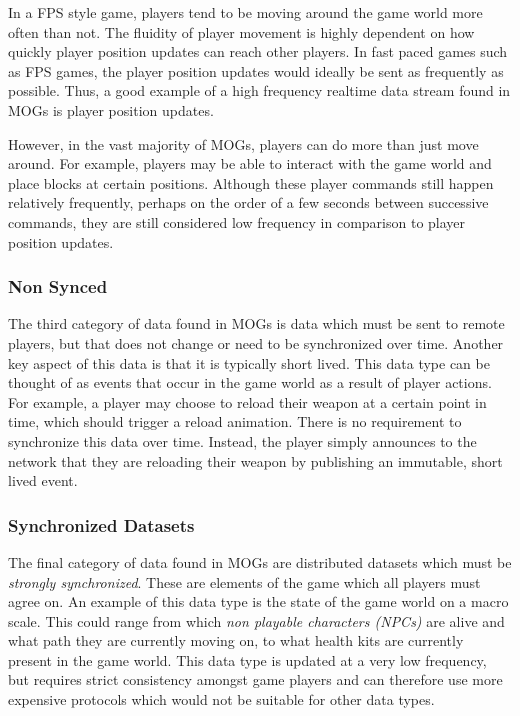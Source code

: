 In a FPS style game, players tend to be moving around the game world more often than not. The fluidity of player movement is highly dependent on how quickly player position updates can reach other players. In fast paced games such as FPS games, the player position updates would ideally be sent as frequently as possible. Thus, a good example of a high frequency realtime data stream found in MOGs is player position updates.

However, in the vast majority of MOGs, players can do more than just move around. For example, players may be able to interact with the game world and place blocks at certain positions. Although these player commands still happen relatively frequently, perhaps on the order of a few seconds between successive commands, they are still considered low frequency in comparison to player position updates. 

\subsubsection*{Non Synced}
The third category of data found in MOGs is data which must be sent to remote players, but that does not change or need to be synchronized over time. Another key aspect of this data is that it is typically short lived. This data type can be thought of as events that occur in the game world as a result of player actions. For example, a player may choose to reload their weapon at a certain point in time, which should trigger a reload animation. There is no requirement to synchronize this data over time. Instead, the player simply announces to the network that they are reloading their weapon by publishing an immutable, short lived event.

\subsubsection*{Synchronized Datasets}       
The final category of data found in MOGs are distributed datasets which must be \textit{strongly synchronized}. These are elements of the game which all players must agree on. An example of this data type is the state of the game world on a macro scale. This could range from which \textit{non playable characters (NPCs)} are alive and what path they are currently moving on, to what health kits are currently present in the game world. This data type is updated at a very low frequency, but requires strict consistency amongst game players and can therefore use more expensive protocols which would not be suitable for other data types.


